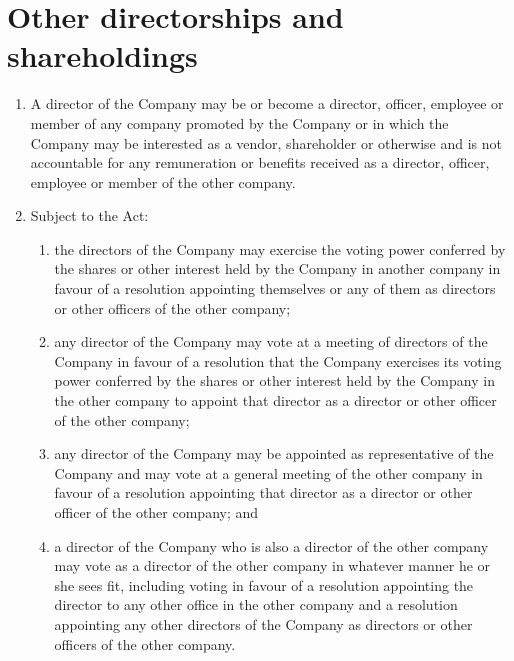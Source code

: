 \section{Other directorships and shareholdings}

\begin{enumerate}[label=(\alph*)]
    \item A director of the Company may be or become a director, officer, employee or member of any company promoted by the Company or in which the Company may be interested as a vendor, shareholder or otherwise and is not accountable for any remuneration or benefits received as a director, officer, employee or member of the other company.
    
    \item Subject to the Act:
    \begin{enumerate}[label=(\roman*)]
        \item the directors of the Company may exercise the voting power conferred by the shares or other interest held by the Company in another company in favour of a resolution appointing themselves or any of them as directors or other officers of the other company;
        
        \item any director of the Company may vote at a meeting of directors of the Company in favour of a resolution that the Company exercises its voting power conferred by the shares or other interest held by the Company in the other company to appoint that director as a director or other officer of the other company;
        
        \item any director of the Company may be appointed as representative of the Company and may vote at a general meeting of the other company in favour of a resolution appointing that director as a director or other officer of the other company; and
        
        \item a director of the Company who is also a director of the other company may vote as a director of the other company in whatever manner he or she sees fit, including voting in favour of a resolution appointing the director to any other office in the other company and a resolution appointing any other directors of the Company as directors or other officers of the other company.
    \end{enumerate}
\end{enumerate} 
